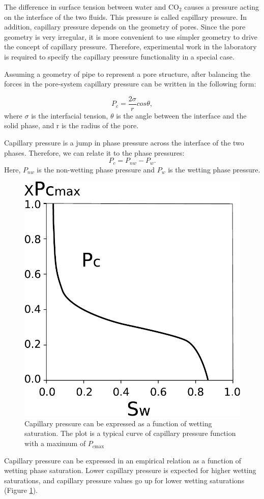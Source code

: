 The difference in surface tension between water and $\mbox{CO}_2$ causes a
pressure acting on the interface of the two fluids. This pressure is called
capillary pressure. In addition, capillary pressure depends on the geometry of
pores. Since the pore geometry is very irregular, it is more convenient to use
simpler geometry to drive the concept of capillary pressure. Therefore,
experimental work in the laboratory is required to specify the capillary
pressure functionality in a special case. 

Assuming a geometry of pipe to represent a pore structure, after balancing the
forces in the pore-system capillary pressure can be written in the following
form:

\begin{equation}
 P_c=\frac{2\sigma}{r}cos\theta,
 \label{eq:pcS}
\end{equation} where $\sigma$ is the interfacial tension, $\theta$ is the angle
between the interface and the solid phase, and r is the radius of the pore.

Capillary pressure is a jump in phase pressure across the interface of the two
phases. Therefore, we can relate it to the phase pressures:
\begin{equation}
 P_c=P_{nw}-P_w.
 \label{eq:pcJump}
\end{equation} Here, $P_{nw}$ is the non-wetting phase pressure and $P_w$ is the
wetting phase pressure. 


\begin{figure} 
  \centering{}
  \includegraphics[width= 0.45 \linewidth]{./figurer/Pc}
  \caption{Capillary pressure can be expressed as a function of wetting
saturation. The plot is a typical curve of capillary pressure function with a
maximum of $P_{c\mbox{max}}$}
  \label{fig:pc}
\end{figure}

Capillary pressure can be expressed in an empirical relation as a function of
wetting phase saturation. Lower capillary pressure is expected for higher
wetting saturations, and capillary pressure values go up for lower wetting
saturations (Figure \ref{fig:pc}). 

